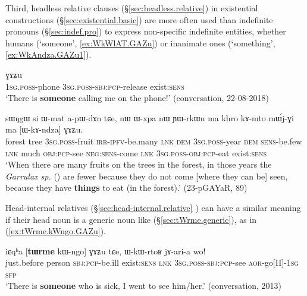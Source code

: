 Third, headless relative clauses (§\ref{sec:headless.relative}) in existential constructions (§\ref{sec:existential.basic}) are more often used than indefinite pronouns (§\ref{sec:indef.pro}) to express non-specific indefinite entities, whether humans (`someone', \ref{ex:WkWlAT.GAZu}) or inanimate ones  (`something', \ref{ex:WkAndza.GAZu1}).

\begin{exe}
\ex \label{ex:WkWlAT.GAZu}
 ɣɤʑu \\
 \textsc{1sg}.\textsc{poss}-phone \textsc{3sg}.\textsc{poss}-\textsc{sbj}:\textsc{pcp}-release exist:\textsc{sens} \\
\glt `There is \textbf{someone} calling me on the phone!' (conversation, 22-08-2018)
\end{exe}

\begin{exe}
\ex \label{ex:WkAndza.GAZu1}
\gll sɯŋgɯ si ɯ-mat a-pɯ-dɤn tɕe, nɯ ɯ-xpa nɯ ɲɯ-rkɯn ma khro kɤ-mto mɯ́j-ɣi ma [ɯ-kɤ-ndza] ɣɤʑu. \\
forest tree \textsc{3sg}.\textsc{poss}-fruit \textsc{irr}-\textsc{ipfv}-be.many \textsc{lnk} \textsc{dem} \textsc{3sg}.\textsc{poss}-year \textsc{dem} \textsc{sens}-be.few \textsc{lnk} much \textsc{obj}:\textsc{pcp}-see \textsc{neg}:\textsc{sens}-come \textsc{lnk} \textsc{3sg}.\textsc{poss}-\textsc{obj}:\textsc{pcp}-eat exist:\textsc{sens} \\
\glt `When there are many fruits on the trees in the forest, in those years the \textit{Garrulax sp.} () are fewer because they do not come [where they can be] seen, because they have \textbf{things} to eat (in the forest).' (23-pGAYaR, 89)
\end{exe}

Head-internal relatives (§\ref{sec:head-internal.relative} ) can have a similar meaning if their head noun is a generic noun like  (§\ref{sec:tWrme.generic}), as in (\ref{ex:tWrme.kWngo.GAZu}).

\begin{exe}
\ex \label{ex:tWrme.kWngo.GAZu}
\gll  iɕqʰa [\textbf{tɯrme} kɯ-ngo] ɣɤʑu tɕe, ɯ-kɯ-rtoʁ jɤ-ari-a wo! \\
just.before person \textsc{sbj}:\textsc{pcp}-be.ill exist:\textsc{sens} \textsc{lnk} \textsc{3sg}.\textsc{poss}-\textsc{sbj}:\textsc{pcp}-see \textsc{aor}-go[II]-\textsc{1sg} \textsc{sfp} \\
\glt `There is \textbf{someone} who is sick, I went to see him/her.' (conversation, 2013)
\end{exe}

